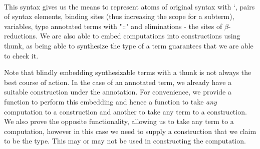 \begin{code}
\AgdaSpace{}%
\<%
\\
%
\\[\AgdaEmptyExtraSkip]%
\>[0]\AgdaSpace{}%
\AgdaSpace{}%
\AgdaSymbol{:}\AgdaSpace{}%
\AgdaSpace{}%
\AgdaSpace{}%
\AgdaSpace{}%
\AgdaSpace{}%
\AgdaSymbol{:}\AgdaSpace{}%
\<%
\\
%
\\[\AgdaEmptyExtraSkip]%
\>[0]\AgdaSpace{}%
\AgdaSymbol{:}\AgdaSpace{}%
\AgdaSpace{}%
\AgdaSpace{}%
\<%
\\
\>[0]\AgdaSpace{}%
%
\>[12]\AgdaSymbol{=}\AgdaSpace{}%
\<%
\\
\>[0]\AgdaSpace{}%
%
\>[12]\AgdaSymbol{=}\AgdaSpace{}%
\<%
\end{code}

This syntax gives us the means to represent atoms of original syntax
with `, pairs of syntax elements, binding sites (thus increasing the scope
for a subterm), variables, type annotated terms with "::" and eliminations
- the sites of $β$-reductions. We are also able to embed computations into
constructions using thunk, as being able to synthesize the type of a term
guarantees that we are able to check it.

Note that blindly embedding synthesizable terms with a thunk is
not always the best course of action. In the case of an annotated
term, we already have a suitable construction under the annotation.
For convenience, we provide a function to perform this embedding and
hence a function to take \emph{any} computation to a construction and
another to take any term to a construction. We also prove the opposite
functionality, allowing us to take any term to a computation, however in
this case we need to supply a construction that we claim to be the type.
This may or may not be used in constructing the computation.

